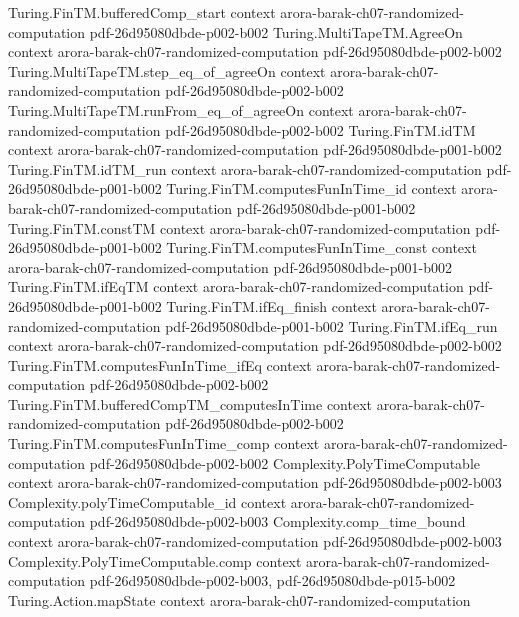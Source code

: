 \begin{theorem}
\proofstep
  {Turing.FinTM.bufferedComp_start}
  {context}
  {arora-barak-ch07-randomized-computation}
  {pdf-26d95080dbde-p002-b002}
\proofstep
  {Turing.MultiTapeTM.AgreeOn}
  {context}
  {arora-barak-ch07-randomized-computation}
  {pdf-26d95080dbde-p002-b002}
\proofstep
  {Turing.MultiTapeTM.step_eq_of_agreeOn}
  {context}
  {arora-barak-ch07-randomized-computation}
  {pdf-26d95080dbde-p002-b002}
\proofstep
  {Turing.MultiTapeTM.runFrom_eq_of_agreeOn}
  {context}
  {arora-barak-ch07-randomized-computation}
  {pdf-26d95080dbde-p002-b002}
\proofstep
  {Turing.FinTM.idTM}
  {context}
  {arora-barak-ch07-randomized-computation}
  {pdf-26d95080dbde-p001-b002}
\proofstep
  {Turing.FinTM.idTM_run}
  {context}
  {arora-barak-ch07-randomized-computation}
  {pdf-26d95080dbde-p001-b002}
\proofstep
  {Turing.FinTM.computesFunInTime_id}
  {context}
  {arora-barak-ch07-randomized-computation}
  {pdf-26d95080dbde-p001-b002}
\proofstep
  {Turing.FinTM.constTM}
  {context}
  {arora-barak-ch07-randomized-computation}
  {pdf-26d95080dbde-p001-b002}
\proofstep
  {Turing.FinTM.computesFunInTime_const}
  {context}
  {arora-barak-ch07-randomized-computation}
  {pdf-26d95080dbde-p001-b002}
\proofstep
  {Turing.FinTM.ifEqTM}
  {context}
  {arora-barak-ch07-randomized-computation}
  {pdf-26d95080dbde-p001-b002}
\proofstep
  {Turing.FinTM.ifEq_finish}
  {context}
  {arora-barak-ch07-randomized-computation}
  {pdf-26d95080dbde-p001-b002}
\proofstep
  {Turing.FinTM.ifEq_run}
  {context}
  {arora-barak-ch07-randomized-computation}
  {pdf-26d95080dbde-p002-b002}
\proofstep
  {Turing.FinTM.computesFunInTime_ifEq}
  {context}
  {arora-barak-ch07-randomized-computation}
  {pdf-26d95080dbde-p002-b002}
\proofstep
  {Turing.FinTM.bufferedCompTM_computesInTime}
  {context}
  {arora-barak-ch07-randomized-computation}
  {pdf-26d95080dbde-p002-b002}
\proofstep
  {Turing.FinTM.computesFunInTime_comp}
  {context}
  {arora-barak-ch07-randomized-computation}
  {pdf-26d95080dbde-p002-b002}
\proofstep
  {Complexity.PolyTimeComputable}
  {context}
  {arora-barak-ch07-randomized-computation}
  {pdf-26d95080dbde-p002-b003}
\proofstep
  {Complexity.polyTimeComputable_id}
  {context}
  {arora-barak-ch07-randomized-computation}
  {pdf-26d95080dbde-p002-b003}
\proofstep
  {Complexity.comp_time_bound}
  {context}
  {arora-barak-ch07-randomized-computation}
  {pdf-26d95080dbde-p002-b003}
\proofstep
  {Complexity.PolyTimeComputable.comp}
  {context}
  {arora-barak-ch07-randomized-computation}
  {pdf-26d95080dbde-p002-b003,
    pdf-26d95080dbde-p015-b002}
\proofstep
  {Turing.Action.mapState}
  {context}
  {arora-barak-ch07-randomized-computation}

\end{theorem}
